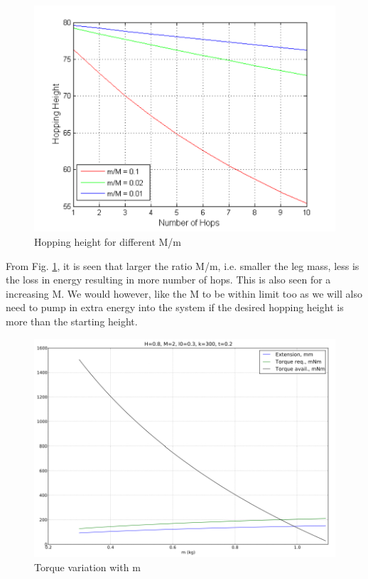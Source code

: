\begin{figure}[!h]
\centering
\includegraphics[scale=0.8]{fig/2mass_hopheight.pdf}
\caption{Hopping height for different M/m}
\label{fig:4_hopping_height}
\end{figure}
From Fig. \ref{fig:4_hopping_height}, it is seen that larger the ratio M/m, i.e. smaller the leg
mass, less is the loss in energy resulting in more number of hops. This is also seen for a increasing M. We would however,
like the M to be within limit too as we will also need to pump in extra energy into the system if the desired hopping
height is more than the starting height.\\
\begin{figure}[!h]
\centering
\includegraphics[scale=1.5]{fig/2mass_m.pdf}
\caption{Torque variation with m}
\label{fig:4_torque2mass}
\end{figure}

